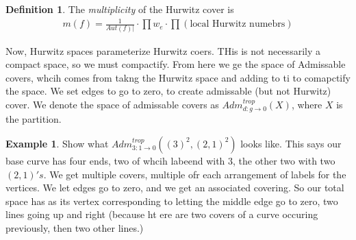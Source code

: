 \documentclass[12pt]{memoir}
\theoremstyle{definition}
\newtheorem{protoexample}{Example}[section]
\newenvironment{ex}
   {\begin{protoexample}}
   {\end{protoexample}}
\newtheorem{protodefinition}{Definition}[section]
\newenvironment{define}
   {\begin{protodefinition}}
   {\end{protodefinition}}
\begin{document}
\begin{define}
    The \emph{multiplicity} of the Hurwitz cover is 
    \begin{align*}
        m(f) = \frac{1}{Aut(f)|} \cdot \prod w_e \cdot \prod(\text{local Hurwitz numebrs})
    \end{align*}
\end{define}

Now, Hurwitz spaces parameterize Hurwitz coers. THis is not necessarily a compact space, so we must compactify. From here we ge the space of Admissable covers, whcih comes from takng the Hurwitz space and adding to ti to comapctify the space. We set edges to go to zero, to create admissable (but not Hurwitz) cover. We denote the space of admissable covers as $Adm_{d:g \rightarrow 0}^{trop}(X)$, where $X$ is the partition.


\begin{ex}
    Show what $Adm_{3:1 \rightarrow 0}^{trop}((3)^2,(2,1)^2)$ looks like. This says our base curve has four ends, two of whcih labeend with $3$, the other two with two $(2,1)'s$. We get multiple covers, multiple ofr each arrangement of labels for the vertices. We let edges go to zero, and we get an associated covering. So our total space has as its vertex corresponding to letting the middle edge go to zero, two lines going up and right (because ht ere are two covers of a curve occuring previously, then two other lines.)
\end{ex}








 

\ifx\nextra\undefined
\printindex
\else\fi
\nocite{*}


\end{document}
